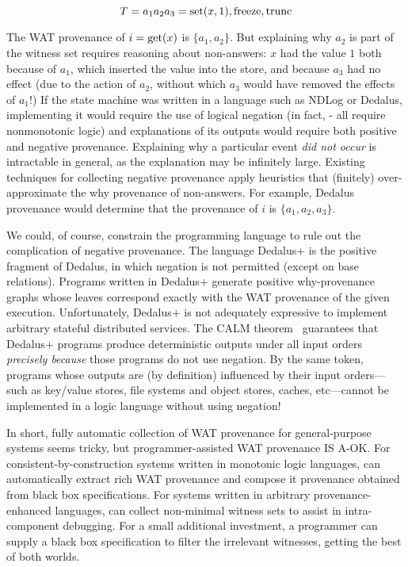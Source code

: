 \[
  T = a_1 a_2 a_3 = \text{set}(x,1), \text{freeze}, \text{trunc}
\]

The WAT provenance of $i = \text{get}(x)$ is $\{a_1, a_2\}$.  But explaining why $a_2$ is part of the witness set requires reasoning about non-answers: $x$ had the value $1$ both because of $a_1$,
which inserted the value into the store, and because $a_3$ had no effect (due to the action of $a_2$, without which $a_3$ would have removed the effects of $a_1$!)
If the state machine was written in a language such as NDLog or Dedalus, implementing it would require the use of logical negation (in fact, - all require nonmonotonic logic) and explanations of its outputs would require both positive and negative provenance.  Explaining why a particular event \emph{did not occur} is intractable in general, as the explanation may be infinitely large.  Existing techniques for collecting negative provenance apply heuristics that (finitely) over-approximate the why provenance of non-answers.  For example, Dedalus provenance would determine that the provenance of $i$ is $\{a_1, a_2, a_3\}$.

We could, of course, constrain the programming language to rule out the complication of negative provenance.  The language Dedalus+\cite{marczak2012confluence} is the positive fragment of Dedalus, in which negation is not permitted (except on base relations).    Programs written in Dedalus+ generate positive why-provenance graphs whose leaves correspond exactly with the WAT provenance of the given execution. Unfortunately, Dedalus+ is not adequately expressive to implement arbitrary stateful distributed services.  The CALM theorem~\cite{alvaro2011consistency,ameloot2013transducers} guarantees that Dedalus+ programs produce deterministic outputs under all input orders \emph{precisely because} those programs do not use negation.  By the same token, programs whose outputs are (by definition) influenced by their input orders---such as key/value stores, file systems and object stores, caches, etc---cannot be implemented in a logic language without using negation!

In short, fully automatic collection of WAT provenance for general-purpose systems seems tricky, but programmer-assisted WAT provenance IS A-OK.  For consistent-by-construction systems written in monotonic logic languages, \fluent{} can automatically extract rich WAT provenance and compose it provenance obtained from black box specifications.  For systems written in arbitrary provenance-enhanced languages, \fluent{} can collect non-minimal witness sets to assist in intra-component debugging.  For a small additional investment, a programmer can supply a black box specification to filter the irrelevant witnesses, getting the best of both worlds.

